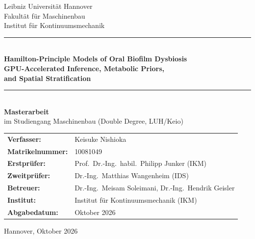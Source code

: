 \documentclass[12pt, a4paper, twoside]{report}
\begin{document}
\begin{titlepage}
  \centering
  \vspace*{2cm}
  {\Large Leibniz Universität Hannover\\[4pt]
         Fakultät für Maschinenbau\\[4pt]
         Institut für Kontinuumsmechanik}\\[2cm]

  \rule{\textwidth}{1.5pt}\\[0.4cm]
  {\LARGE\bfseries Hamilton-Principle Models of Oral Biofilm Dysbiosis}\\[8pt]
  {\large\bfseries GPU-Accelerated Inference, Metabolic Priors,\\[2pt]
   and Spatial Stratification}\\[0.4cm]
  \rule{\textwidth}{1.5pt}\\[1.5cm]

  {\large\bfseries Masterarbeit}\\[0.5cm]
  {\large im Studiengang Maschinenbau (Double Degree, LUH/Keio)}\\[2cm]

  \begin{tabular}{ll}
    \textbf{Verfasser:}       & Keisuke Nishioka \\
    \textbf{Matrikelnummer:}  & 10081049 \\
    \textbf{Erstprüfer:}      & Prof.\ Dr.-Ing.\ habil.\ Philipp Junker (IKM) \\
    \textbf{Zweitprüfer:}     & Dr.-Ing.\ Matthias Wangenheim (IDS) \\
    \textbf{Betreuer:}        & Dr.-Ing.\ Meisam Soleimani, Dr.-Ing.\ Hendrik Geisler \\
    \textbf{Institut:}        & Institut für Kontinuumsmechanik (IKM) \\
    \textbf{Abgabedatum:}     & Oktober 2026 \\
  \end{tabular}

  \vfill
  {\small Hannover, Oktober 2026}
\end{titlepage}

\end{document}
